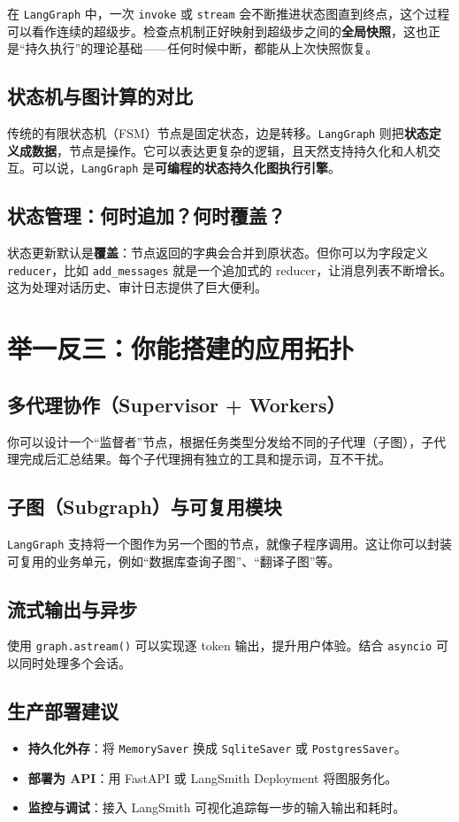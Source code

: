 \documentclass[12pt,a4paper]{ctexart}
\newcommand{\langgraph}{\texttt{LangGraph}}
\begin{document}
在 \langgraph{} 中，一次 \texttt{invoke} 或 \texttt{stream} 会不断推进状态图直到终点，这个过程可以看作连续的超级步。检查点机制正好映射到超级步之间的\textbf{全局快照}，这也正是“持久执行”的理论基础——任何时候中断，都能从上次快照恢复。

\subsection{状态机与图计算的对比}
传统的有限状态机（FSM）节点是固定状态，边是转移。\langgraph{} 则把\textbf{状态定义成数据}，节点是操作。它可以表达更复杂的逻辑，且天然支持持久化和人机交互。可以说，\langgraph{} 是\textbf{可编程的状态持久化图执行引擎}。

\subsection{状态管理：何时追加？何时覆盖？}
状态更新默认是\textbf{覆盖}：节点返回的字典会合并到原状态。但你可以为字段定义 \texttt{reducer}，比如 \texttt{add\_messages} 就是一个追加式的 reducer，让消息列表不断增长。这为处理对话历史、审计日志提供了巨大便利。

\section{举一反三：你能搭建的应用拓扑}
\label{sec:extend}

\subsection{多代理协作（Supervisor + Workers）}
你可以设计一个“监督者”节点，根据任务类型分发给不同的子代理（子图），子代理完成后汇总结果。每个子代理拥有独立的工具和提示词，互不干扰。

\subsection{子图（Subgraph）与可复用模块}
\langgraph{} 支持将一个图作为另一个图的节点，就像子程序调用。这让你可以封装可复用的业务单元，例如“数据库查询子图”、“翻译子图”等。

\subsection{流式输出与异步}
使用 \texttt{graph.astream()} 可以实现逐 token 输出，提升用户体验。结合 \texttt{asyncio} 可以同时处理多个会话。

\subsection{生产部署建议}
\begin{itemize}
    \item \textbf{持久化外存}：将 \texttt{MemorySaver} 换成 \texttt{SqliteSaver} 或 \texttt{PostgresSaver}。
    \item \textbf{部署为 API}：用 FastAPI 或 LangSmith Deployment 将图服务化。
    \item \textbf{监控与调试}：接入 LangSmith 可视化追踪每一步的输入输出和耗时。
\end{itemize}
\end{document}
